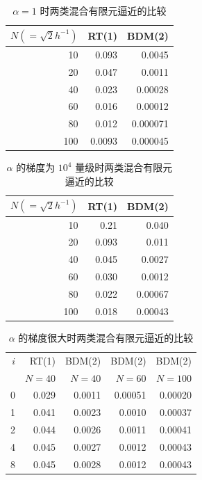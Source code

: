 \begin{table}[!htbp]
  \centering
  \caption{\(\alpha=1\) 时两类混合有限元逼近的比较}\label{tab:7.2.1}
  \begin{tabular}{rrr}
    \toprule
    \(N(=\sqrt2h^{-1})\)&RT(1)&BDM(2)\\
    \midrule
     10 & 0.093 & 0.0045\\
     20 & 0.047 & 0.0011\\
     40 & 0.023 & 0.00028\\
     60 & 0.016 & 0.00012\\
     80 & 0.012 & 0.000071\\
    100 & 0.0093 & 0.000045\\
    \bottomrule
  \end{tabular}
\end{table}

\begin{table}[!htbp]
  \centering
  \caption{\(\alpha\) 的梯度为 \(10^4\) 量级时两类混合有限元逼近的比较}\label{tab:7.2.2}
  \begin{tabular}{rrr}
    \toprule
    \(N(=\sqrt2h^{-1})\)&RT(1)&BDM(2)\\
    \midrule
     10 & 0.21 & 0.040\\
     20 & 0.093 & 0.011\\
     40 & 0.045 & 0.0027\\
     60 & 0.030 & 0.0012\\
     80 & 0.022 & 0.00067\\
    100 & 0.018 & 0.00043\\
    \bottomrule
  \end{tabular}
\end{table}

\begin{table}[!htbp]
  \centering
  \caption{\(\alpha\) 的梯度很大时两类混合有限元逼近的比较}\label{tab:7.2.3}
  \begin{tabular}{rrrrr}
    \toprule
    \(i\)&RT(1)&BDM(2)&BDM(2)&BDM(2)\\
    &\(N=40\)&\(N=40\)&\(N=60\)&\(N=100\)\\
    \midrule
     0 & 0.029 & 0.0011 & 0.00051 & 0.00020\\
     1 & 0.041 & 0.0023 & 0.0010 & 0.00037\\
     2 & 0.044 & 0.0026 & 0.0011 & 0.00041\\
     4 & 0.045 & 0.0027 & 0.0012 & 0.00043\\
     8 & 0.045 & 0.0028 & 0.0012 & 0.00043\\
    \bottomrule
  \end{tabular}
\end{table}

